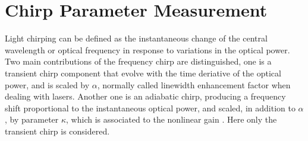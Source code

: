 \section{Chirp Parameter Measurement}\label{sec:chirp_measurement}


Light chirping can be defined as the instantaneous change of the central wavelength or optical frequency in response to
variations in the optical power. Two main contributions of the frequency chirp are distinguished, one is a transient chirp component that evolve with the time deriative of the optical power, and is scaled by $\alpha$, normally called linewidth enhancement factor when dealing with lasers. Another one is an adiabatic chirp, producing a frequency shift proportional to the instantaneous optical power, and scaled, in addition to $\alpha$, by parameter $\kappa$, which is associated to the nonlinear gain \cite{villafranca2007precise, harder1983measurement}. Here only the transient chirp is considered. 

